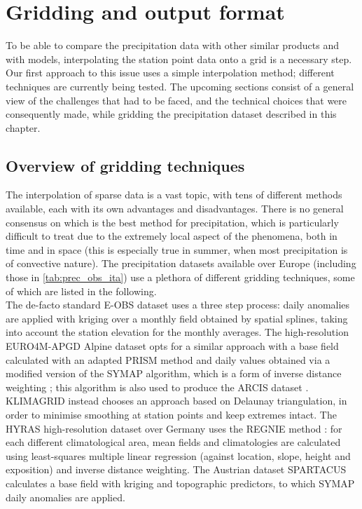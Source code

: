 \section{Gridding and output format}\label{sec:gridding}
To be able to compare the precipitation data with other similar products and with models, interpolating the station point data onto a grid is a necessary step.
Our first approach to this issue uses a simple interpolation method; different techniques are currently being tested.
The upcoming sections consist of a general view of the challenges that had to be faced, and the technical choices that were consequently made, while gridding the precipitation dataset described in this chapter.

\subsection{Overview of gridding techniques}\label{sec:gridding_techniques}
The interpolation of sparse data is a vast topic, with tens of different methods available, each with its own advantages and disadvantages.
There is no general consensus on which is the best method for precipitation, which is particularly difficult to treat due to the extremely local aspect of the phenomena, both in time and in space (this is especially true in summer, when most precipitation is of convective nature).
The precipitation datasets available over Europe (including those in \cref{tab:prec_obs_ita}) use a plethora of different gridding techniques, some of which are listed in the following.\\

The de-facto standard E-OBS dataset \citep{Haylock2008} uses a three step process: daily anomalies are applied with kriging over a monthly field obtained by spatial splines, taking into account the station elevation for the monthly averages.
The high-resolution EURO4M-APGD Alpine dataset \citep{Isotta2014} opts for a similar approach with a base field calculated with an adapted PRISM method \citep{Daly1994,Schwarb2001} and daily values obtained via a modified version of the SYMAP algorithm, which is a form of inverse distance weighting \citep{Shepard1984};
this algorithm \citep[adapted by][]{Antolini2016} is also used to produce the ARCIS dataset \citep{Pavan2018}.
KLIMAGRID \citep{Mohr2008,Mohr2009} instead chooses an approach based on Delaunay triangulation, in order to minimise smoothing at station points and keep extremes intact.
The HYRAS \citep{Rauthe2013} high-resolution dataset over Germany uses the REGNIE method \citep{Weerts2008}: for each different climatological area, mean fields and climatologies are calculated using least-squares multiple linear regression (against location, slope, height and exposition) and inverse distance weighting.
The Austrian dataset SPARTACUS \citep{Hiebl2017} calculates a base field with kriging and topographic predictors, to which SYMAP daily anomalies are applied.

